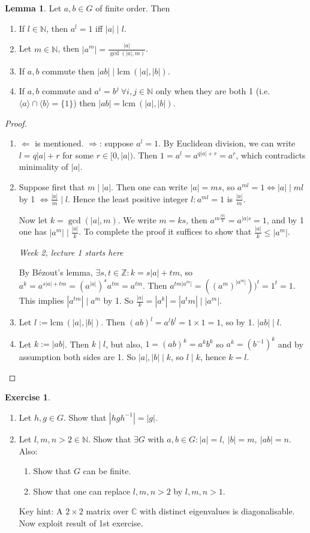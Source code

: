 \documentclass[a4paper]{article}
\newcommand{\lcm}{\text{lcm}\ }
\theoremstyle{definition}
\newtheorem{lemma}[defn]{Lemma}
\newtheorem{exe}[defn]{Exercise}
\begin{document}
\begin{lemma}
Let $a,b\in G$ of finite order. Then
\begin{enumerate}
\item If $l\in \mathbb N$, then $a^l=1$ iff $|a|\mid l$.
\item Let $m\in \mathbb N$, then $\displaystyle |a^m|=\frac{|a|}{\gcd (|a|,m)}$.
\item If $a,b$ commute then $|ab|\mid \lcm (|a|,|b|)$.
\item If $a,b$ commute and $a^i=b^j \ \forall i,j\in \mathbb N$ only when they are both 1 (i.e. $\langle a\rangle \cap \langle b\rangle =\{1\}$) then $|ab|= \lcm (|a|,|b|)$.
\end{enumerate}
\end{lemma}
\begin{proof}
\begin{enumerate}
\item $\Leftarrow$ is mentioned. $\Rightarrow$: suppose $a^l=1$. By Euclidean division, we can write $l=q|a|+r$ for some $r\in[0,|a|)$. Then $1=a^l=a^{q|a|+r}=a^r$, which contradicts minimality of $|a|$.
\item Suppose first that $m\mid |a|$. Then one can write $|a|=ms$, so $a^{ml}=1\Leftrightarrow |a| \mid ml$ by 1 $\displaystyle \Leftrightarrow \frac{|a|}{m}\mid l$. Hence the least positive integer $l:a^{ml}=1$ is $\displaystyle \frac{|a|}{m}$.

Now let $k=\gcd (|a|,m)$. We write $m=ks$, then $a^{m\frac{|a|}{k}}=a^{|a|s}=1$, and by 1 one has $|a^m| \mid \frac{|a|}{k}$. To complete the proof it suffices to show that $\frac{|a|}{k}\leq |a^m|$.
\begin{flushright}
\textit{Week 2, lecture 1 starts here}
\end{flushright}
By Bézout's lemma, $\exists s,t\in\mathbb Z:k=s|a|+tm$, so $a^k=a^{s|a|+tm}=(a^{|a|})^s a^{tm}=a^{tm}$. Then $a^{tm|a^m|}=((a^m)^{|a^m|}))^t=1^t=1$. This implies $|a^{tm}|\mid a^m$ by 1. So $\frac{|a|}{k}=|a^k|=|a^tm|\mid |a^m|$.
\item Let $l:=\lcm(|a|,|b|)$. Then $(ab)^l=a^lb^l=1\times 1=1$, so by 1. $|ab|\mid l$.
\item Let $k:=|ab|$. Then $k\mid l$, but also, $1=(ab)^k=a^kb^k$ so $a^k=\left(b^{-1}\right)^k$ and by assumption both sides are 1. So $|a|,|b|\mid k$, so $l\mid k$, hence $k=l$.
\end{enumerate}
\end{proof}
\begin{exe}
\begin{enumerate}
\item Let $h,g\in G$. Show that $\left|hgh^{-1}\right|=|g|$.
\item Let $l,m,n>2\in\mathbb N$. Show that $\exists G$ with $a,b\in G:|a|=l,\ |b|=m,\ |ab|=n$. Also:
\begin{enumerate}
\item Show that $G$ can be finite.
\item Show that one can replace $l,m,n>2$ by $l,m,n>1$.
\end{enumerate}
Key hint: A $2\times 2$ matrix over $\mathbb C$ with distinct eigenvalues is diagonalisable. Now exploit result of 1st exercise.
\end{enumerate}
\end{exe}
\end{document}
